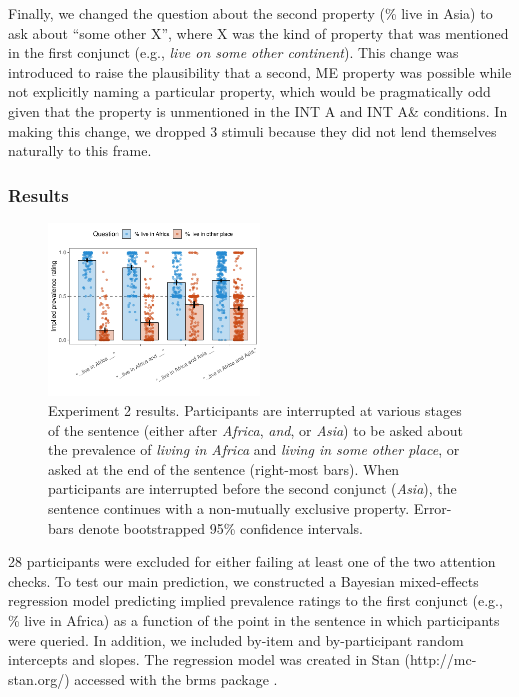 \documentclass[10pt,letterpaper]{article}
\newcommand{\mh}[1]{{\textcolor{Blue}{[mh: #1]}}}
\begin{document}
Finally, we changed the question about the second property (\% live in Asia) to ask about ``some other X'', where X was the kind of property that was mentioned in the first conjunct (e.g., \emph{live on some other continent}).
This change was introduced to raise the plausibility that a second, ME property was possible while not explicitly naming a particular property, which would be pragmatically odd given that the property is unmentioned in the INT A and INT A\& conditions. 
In making this change, we dropped 3 stimuli because they did not lend themselves naturally to this frame.
 \subsubsection{Results}
 
\begin{figure}[h]
  \centering
    \includegraphics[width=0.5\textwidth]{expt3_summary}
    \vspace{-1cm}
  \caption{Experiment 2 results. Participants are interrupted at various stages of the sentence (either after \emph{Africa}, \emph{and}, or \emph{Asia}) to be asked about the prevalence of \emph{living in Africa} and \emph{living in some other place}, or asked at the end of the sentence (right-most bars). When participants are interrupted before the second conjunct (\emph{Asia}), the sentence continues with a non-mutually exclusive property. Error-bars denote bootstrapped 95\% confidence intervals.}
    \label{fig:expt3}
        \vspace{-0.5cm}
  \end{figure}
  
% 

28 participants were excluded for either failing at least one of the two attention checks.
To test our main prediction, we constructed a Bayesian mixed-effects regression model predicting implied prevalence ratings to the first conjunct (e.g., \% live in Africa) as a function of the point in the sentence in which participants were queried. 
In addition, we included by-item and by-participant random intercepts and slopes. 
The regression model was created in Stan (http://mc-stan.org/) accessed with the brms package \cite{burkner_brms_2017}.
\end{document}
